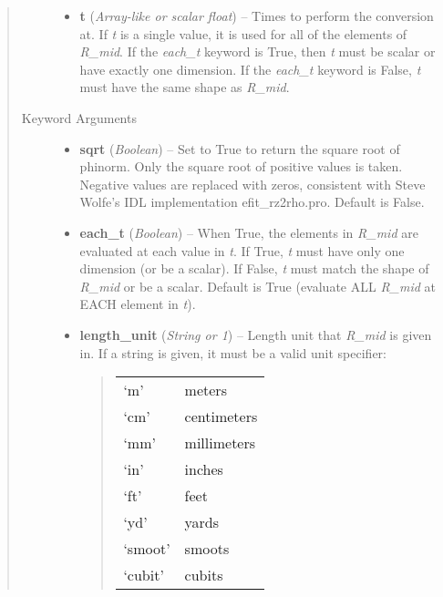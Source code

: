 \documentclass[letterpaper,10pt,english]{sphinxmanual}
\begin{document}
\begin{fulllineitems}
\begin{fulllineitems}
\begin{quote}
\begin{description}
\begin{itemize}
\item {} 
\textbf{t} (\emph{Array-like or scalar float}) --
Times to perform the conversion at.
If \emph{t} is a single value, it is used for all of the elements of
\emph{R\_mid}. If the \emph{each\_t} keyword is True, then \emph{t} must be scalar
or have exactly one dimension. If the \emph{each\_t} keyword is False,
\emph{t} must have the same shape as \emph{R\_mid}.

\end{itemize}

\item[{Keyword Arguments}] \leavevmode\begin{itemize}
\item {} 
\textbf{sqrt} (\emph{Boolean}) --
Set to True to return the square root of phinorm.
Only the square root of positive values is taken. Negative
values are replaced with zeros, consistent with Steve Wolfe's
IDL implementation efit\_rz2rho.pro. Default is False.

\item {} 
\textbf{each\_t} (\emph{Boolean}) --
When True, the elements in \emph{R\_mid} are evaluated
at each value in \emph{t}. If True, \emph{t} must have only one dimension
(or be a scalar). If False, \emph{t} must match the shape of \emph{R\_mid}
or be a scalar. Default is True (evaluate ALL \emph{R\_mid} at EACH
element in \emph{t}).

\item {} 
\textbf{length\_unit} (\emph{String or 1}) --
Length unit that \emph{R\_mid} is given in.
If a string is given, it must be a valid unit specifier:
\begin{quote}

\begin{tabulary}{\linewidth}{|L|L|}
\hline

`m'
 & 
meters
\\

`cm'
 & 
centimeters
\\

`mm'
 & 
millimeters
\\

`in'
 & 
inches
\\

`ft'
 & 
feet
\\

`yd'
 & 
yards
\\

`smoot'
 & 
smoots
\\

`cubit'
 & 
cubits
\\


\end{tabulary}
\end{quote}
\end{itemize}
\end{description}
\end{quote}
\end{fulllineitems}
\end{fulllineitems}
\end{document}
